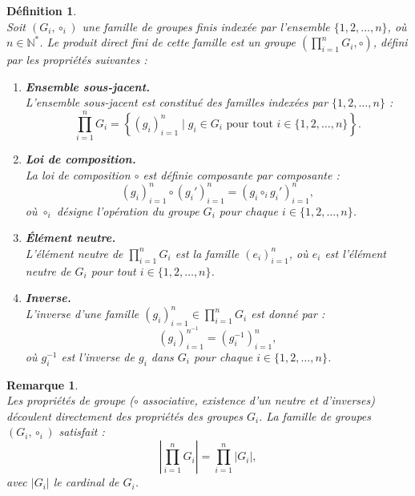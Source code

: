 \documentclass[a4paper, 14pt]{report}
\newtheorem{definition}{Définition}[section]
\newtheorem{remark}{Remarque}[section]
\begin{document}
\begin{onehalfspace}
{			\begin{definition} \cite{schaub1997}\\
Soit \( (G_i, \circ_i) \) une famille de groupes finis indexée par l'ensemble \( \{1, 2, \dots, n\} \), où \( n \in \mathbb{N}^{*} \). Le \textit{produit direct fini} de cette famille est un groupe \( \left( \prod_{i=1}^{n} G_i, \circ \right) \), défini par les propriétés suivantes : 
				\begin{enumerate}[label=\roman*)]
					\item \textbf{Ensemble sous-jacent.} \\
L'ensemble sous-jacent est constitué des familles indexées par \( \{1, 2, \dots, n\} \) :  
					\[
					\prod_{i=1}^{n} G_i = \left\{ (g_i)_{i=1}^{n} \mid g_i \in G_i \text{ pour tout } i \in \{1, 2, \dots, n\} \right\}.
					\]
					\item \textbf{Loi de composition.} \\
					La loi de composition \( \circ \) est définie composante par composante :  
					\[
					(g_i)_{i=1}^{n} \circ (g_i')_{i=1}^{n} = (g_i \circ_i g_i')_{i=1}^{n},
					\]  
					où \( \circ_i \) désigne l'opération du groupe \( G_i \) pour chaque \( i \in \{1, 2, \dots, n\} \).
					\item \textbf{Élément neutre.} \\
					L'élément neutre de \( \prod_{i=1}^{n} G_i \) est la famille \( (e_i)_{i=1}^{n} \), où \( e_i \) est l'élément neutre de \( G_i \) pour tout \( i \in \{1, 2, \dots, n\} \).
					\item \textbf{Inverse.} \\
					L'inverse d'une famille \( (g_i)_{i=1}^{n} \in \prod_{i=1}^{n} G_i \) est donné par :  
					\[
					(g_i)_{i=1}^{{n}^{-1}} = (g_i^{-1})_{i=1}^{n},
					\]  
					où \( g_i^{-1} \) est l'inverse de \( g_i \) dans \( G_i \) pour chaque \( i \in \{1, 2, \dots, n\} \).\\
				\end{enumerate}
			\end{definition}
			
			
			\begin{remark} \cite{schaub1997} \\
Les propriétés de groupe (\( \circ \) associative, existence d’un neutre et d’inverses) découlent directement des propriétés des groupes \( G_i \).
La famille de groupes \( (G_i, \circ_i) \) satisfait :
				\[
				\left| \prod_{i=1}^{n} G_i \right| = \prod_{i=1}^{n} |G_i|,
				\]
				avec \( |G_i| \) le cardinal de \( G_i \).\\
			\end{remark}
			
}
\end{onehalfspace}
\end{document}
